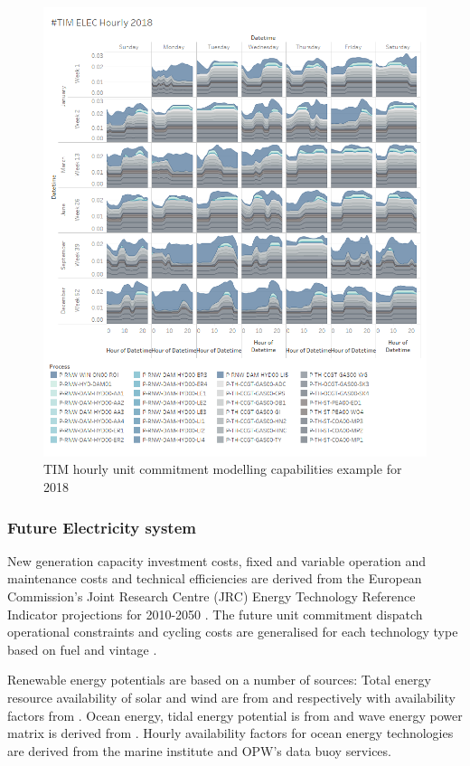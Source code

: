 \documentclass[gmd,manuscript]{copernicus}
\begin{document}
\begin{figure}[!htbp]
 \centering
 \includegraphics[scale=0.6]{figures/TIM_Elec_Hourly.png} 
 \caption{TIM hourly unit commitment modelling capabilities example for 2018}
 \label{fig:TIM_HourlyELC}
\end{figure}

\subsubsection{Future Electricity system}
New generation capacity investment costs, fixed and variable operation and maintenance costs and technical efficiencies are derived from the European Commission's Joint Research Centre (JRC) Energy Technology Reference Indicator projections for 2010-2050 \citep{Carlsson2014}. The future unit commitment dispatch operational constraints and cycling costs are generalised for each technology type based on fuel and vintage \citep{Kumar2012}. 

Renewable energy potentials are based on a number of sources: Total energy resource availability of solar and wind are from \citet{Pfenninger2016} and \citet{Staffell2016} respectively with availability factors from \citet{Ruiz2019}. Ocean energy, tidal energy potential is from \citet{ORourke2010} and wave energy power matrix is derived from \citet{Nambiar2016}. Hourly availability factors for ocean energy technologies are derived from the marine institute and OPW's data buoy services.
\end{document}
